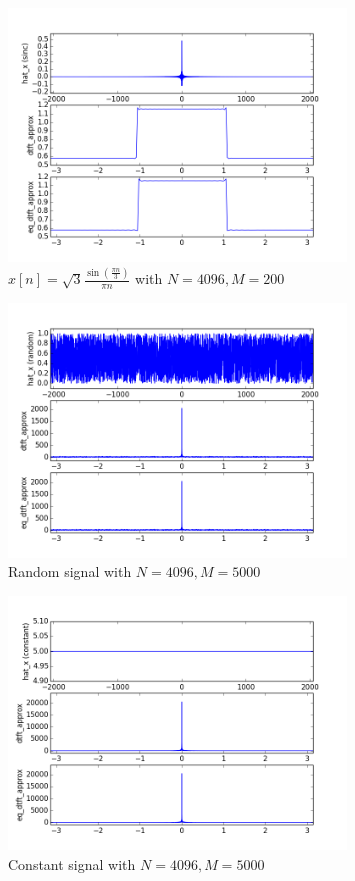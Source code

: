 \begin{figure}[htbp]
	\centering
	\includegraphics[width=0.8\textwidth]{images/p6-5-200}
	\caption{$x[n] = \sqrt{3}\frac{\sin(\frac{\pi n}{3})}{\pi n}$ with $N=4096, M=200$}
	\label{fig:p6-5-200}
\end{figure}


\begin{figure}[htbp]
	\centering
	\includegraphics[width=0.8\textwidth]{images/p6-1-5000}
	\caption{Random signal with $N=4096, M=5000$}
	\label{fig:p6-1-5000}
\end{figure}

\begin{figure}[htbp]
	\centering
	\includegraphics[width=0.8\textwidth]{images/p6-2-5000}
	\caption{Constant signal with $N=4096, M=5000$}
	\label{fig:p6-2-5000}
\end{figure}


